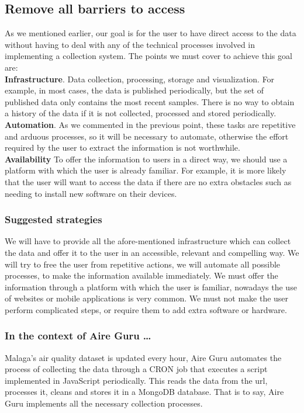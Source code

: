 \subsection{Remove all barriers to access}
As we mentioned earlier, our goal is for the user to have direct access to the data without having to deal with any
of the technical processes involved in implementing a collection system. The points we must cover to achieve this goal are: \\

\textbf{Infrastructure}. Data collection, processing, storage and visualization. For example, in most cases, the data is
published periodically, but the set of published data only contains the most recent samples. There is no way to obtain
a history of the data if it is not collected, processed and stored periodically. \\

\textbf{Automation}. As we commented in the previous point, these tasks are repetitive and arduous processes, so it will be
necessary to automate, otherwise the effort required by the user to extract the information is not worthwhile. \\

\textbf{Availability} To offer the information to users in a direct way, we should use a platform with which the user is already 
familiar. For example, it is more likely that the user will want to access the data if there are no extra obstacles such as needing 
to install new software on their devices. \\

\subsubsection*{Suggested strategies} 
We will have to provide all the afore-mentioned infrastructure which can collect the data and offer it to the user in an accessible, relevant and compelling way.
We will try to free the user from repetitive actions, we will automate all possible processes, to make the information available immediately.
We must offer the information through a platform with which the user is familiar, nowadays the use of websites or mobile applications is very common.
We must not make the user perform complicated steps, or require them to add extra software or hardware.

\subsubsection*{In the context of Aire Guru \ldots} 
Malaga's air quality dataset is updated every hour, Aire Guru automates the process of collecting the
data through a CRON job that executes a script implemented in JavaScript periodically. This reads the data from the url, processes it,
cleans and stores it in a MongoDB database. That is to say, Aire Guru implements all the necessary collection processes.

